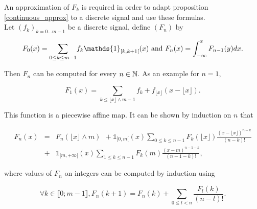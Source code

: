 
An approximation of $F_{k}$ is required in order to adapt proposition \ref{continuous_approx} to a discrete signal and use these formulas.\\
\medbreak
Let $(f_k)_{k=0...m-1}$ be a discrete signal, define $(F_n)$ by

\begin{equation}
F_{0} (x) =\underset{0\le k \le m-1}{\sum}f_{k} \mathds{1}_{[k,k+1[}(x) \txt{ and }  F_{n}(x)=\int_{-\infty}^{x}F_{n-1}(y)dx.
\label{defintion_fn}
\end{equation}

\noindent Then $F_{n}$ can be computed for every $n\in\mathbb{N}$. As an example for $n=1$,

\begin{equation*}
F_{1}(x)=\underset{k\le \lfloor x\rfloor \wedge m-1}{\sum}f_{k}+ f_{\lfloor x\rfloor}
(x-\lfloor x\rfloor).
\end{equation*}

\noindent This function is a piecewise affine map. It can be shown by induction on $n$ that

\begin{eqnarray*}
F_{n}(x) &=& F_{n}(\lfloor x\rfloor \wedge m)~~+\mathds{1}_{[0,m[}(x) \underset{0\le k \le n-1}{\sum}F_{k}(\lfloor x \rfloor) \frac{(x-\lfloor x \rfloor)^{n-k}}{(n-k)!}\\
          &+&\mathds{1}_{[m,+\infty[}(x)\underset{1\le k \le n-1}{\sum}F_{k}(m) \frac{(x-m)^{n-1-k}}{(n-1-k)!},
\end{eqnarray*}

\noindent where values of $F_n$ on integers can be computed by induction using

\begin{equation*}
\forall k \in \llbracket 0 ; m-1 \rrbracket, F_{n}(k+1)=F_{n}(k)+\underset{0\le l < n}{\sum} \frac{F_{l}(k)}{(n-l)!}.
\end{equation*}




